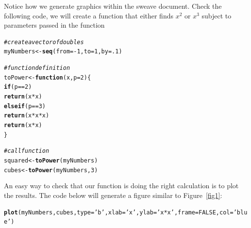 \documentclass[10pt]{article}\usepackage[]{graphicx}\usepackage[]{color}
\makeatletter
\newcommand{\hlnum}[1]{\textcolor[rgb]{0.686,0.059,0.569}{#1}}%
\newcommand{\hlstr}[1]{\textcolor[rgb]{0.192,0.494,0.8}{#1}}%
\newcommand{\hlcom}[1]{\textcolor[rgb]{0.678,0.584,0.686}{\textit{#1}}}%
\newcommand{\hlopt}[1]{\textcolor[rgb]{0,0,0}{#1}}%
\newcommand{\hlstd}[1]{\textcolor[rgb]{0.345,0.345,0.345}{#1}}%
\newcommand{\hlkwa}[1]{\textcolor[rgb]{0.161,0.373,0.58}{\textbf{#1}}}%
\newcommand{\hlkwb}[1]{\textcolor[rgb]{0.69,0.353,0.396}{#1}}%
\newcommand{\hlkwc}[1]{\textcolor[rgb]{0.333,0.667,0.333}{#1}}%
\newcommand{\hlkwd}[1]{\textcolor[rgb]{0.737,0.353,0.396}{\textbf{#1}}}%
\newenvironment{kframe}{%
 \def\at@end@of@kframe{}%
 \ifinner\ifhmode%
  \def\at@end@of@kframe{\end{minipage}}%
  \begin{minipage}{\columnwidth}%
 \fi\fi%
 \def\FrameCommand##1{\hskip\@totalleftmargin \hskip-\fboxsep
 \colorbox{shadecolor}{##1}\hskip-\fboxsep
     \hskip-\linewidth \hskip-\@totalleftmargin \hskip\columnwidth}%
 \MakeFramed {\advance\hsize-\width
   \@totalleftmargin\z@ \linewidth\hsize
   \@setminipage}}%
 {\par\unskip\endMakeFramed%
 \at@end@of@kframe}
\newenvironment{knitrout}{}{} %
\makeatother
\begin{document}
Notice how we generate graphics within the sweave document. Check the following code, we will create a function that either finds $x^2$ or $x^3$ subject to parameters passed in the function
\begin{knitrout}
\color{fgcolor}\begin{kframe}
\begin{alltt}
\hlcom{# create a vector of doubles}
\hlstd{myNumbers} \hlkwb{<-} \hlkwd{seq}\hlstd{(}\hlkwc{from}\hlstd{=}\hlopt{-}\hlnum{1}\hlstd{,}\hlkwc{to}\hlstd{=}\hlnum{1}\hlstd{,}\hlkwc{by}\hlstd{=}\hlnum{.1}\hlstd{)}

\hlcom{# function definition}
\hlstd{toPower} \hlkwb{<-} \hlkwa{function} \hlstd{(}\hlkwc{x}\hlstd{,}\hlkwc{p}\hlstd{=}\hlnum{2}\hlstd{) \{}
    \hlkwa{if} \hlstd{(p}\hlopt{==}\hlnum{2}\hlstd{)}
        \hlkwd{return} \hlstd{(x}\hlopt{*}\hlstd{x)}
    \hlkwa{else if} \hlstd{(p}\hlopt{==}\hlnum{3}\hlstd{)}
        \hlkwd{return} \hlstd{(x}\hlopt{*}\hlstd{x}\hlopt{*}\hlstd{x)}
    \hlkwd{return} \hlstd{(x}\hlopt{*}\hlstd{x)}
\hlstd{\}}

\hlcom{# call function}
\hlstd{squared} \hlkwb{<-} \hlkwd{toPower}\hlstd{(myNumbers)}
\hlstd{cubes} \hlkwb{<-} \hlkwd{toPower}\hlstd{(myNumbers,}\hlnum{3}\hlstd{)}
\end{alltt}
\end{kframe}
\end{knitrout}

An easy way to check that our function is doing the right calculation is to plot the results. The code below will generate a figure similar to Figure~\ref{fig1}: 
\begin{knitrout}
\color{fgcolor}\begin{kframe}
\begin{alltt}
\hlkwd{plot}\hlstd{(myNumbers,cubes,}\hlkwc{type}\hlstd{=}\hlstr{'b'}\hlstd{,}\hlkwc{xlab} \hlstd{=} \hlstr{'x'}\hlstd{,} \hlkwc{ylab} \hlstd{=} \hlstr{'x*x'}\hlstd{,}\hlkwc{frame}\hlstd{=}\hlnum{FALSE}\hlstd{,}\hlkwc{col}\hlstd{=}\hlstr{'blue'}\hlstd{)}
\end{alltt}
\end{kframe}
\end{knitrout}
\end{document}
